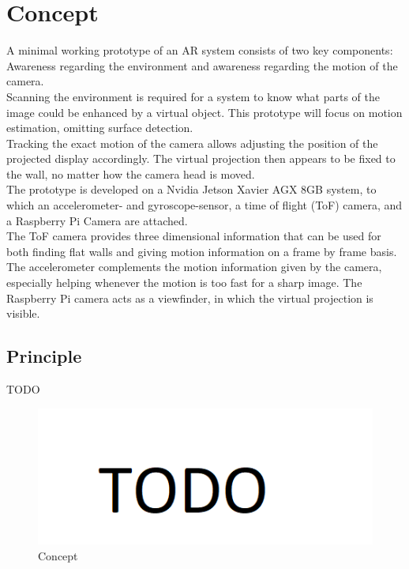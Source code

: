 \chapter{Concept}
\label{sec:Concept}
A minimal working prototype of an AR system consists of two key components: Awareness regarding the environment and awareness regarding the motion of the camera.\\
Scanning the environment is required for a system to know what parts of the image could be enhanced by a virtual object. This prototype will focus on motion estimation, omitting surface detection.\\
Tracking the exact motion of the camera allows adjusting the position of the projected display accordingly. The virtual projection then appears to be fixed to the wall, no matter how the camera head is moved.\\ 
The prototype is developed on a Nvidia Jetson Xavier AGX 8GB system, to which an accelerometer- and gyroscope-sensor, a time of flight (ToF) camera, and a Raspberry Pi Camera are attached.\\
The ToF camera provides three dimensional information that can be used for both finding flat walls and giving motion information on a frame by frame basis. The accelerometer complements the motion information given by the camera, especially helping whenever the motion is too fast for a sharp image. The Raspberry Pi camera acts as a viewfinder, in which the virtual projection is visible.\\


\section{Principle}
TODO

\begin{figure}[H]
    \centering
    \includegraphics[width=1.0\textwidth]{images/todo.png}
    \caption{Concept}
    \label{fig:HW_concept}
\end{figure}

